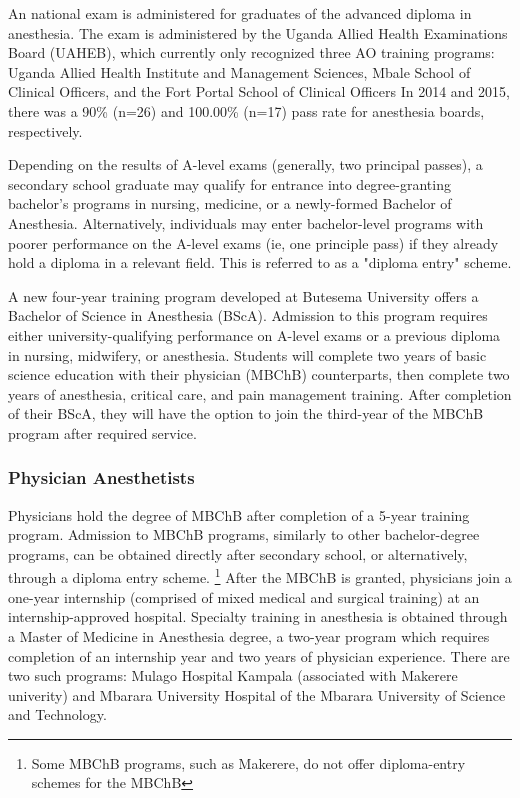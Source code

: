 \documentclass[12pt]{article} %
\begin{document}
An national exam is administered for graduates of the advanced diploma in anesthesia. The exam is administered by the Uganda Allied Health Examinations Board (UAHEB), which currently only recognized three AO training programs: Uganda Allied Health Institute and Management Sciences, Mbale School of Clinical Officers, and the Fort Portal School of Clinical Officers
\citet{examboardschools}
In 2014 and 2015, there was a 90\%  (n=26) and 100.00\% (n=17) pass rate for anesthesia boards, respectively.
\citet{examboard2015}

Depending on the results of A-level exams (generally, two principal passes), a secondary school graduate may qualify for entrance into degree-granting bachelor's programs in nursing, medicine, or a newly-formed Bachelor of Anesthesia. Alternatively, individuals may enter bachelor-level programs with poorer performance on the A-level exams (ie, one principle pass) if they already hold a diploma in a relevant field. This is referred to as a "diploma entry" scheme.
\citet{mak2018}

A new four-year training program developed at Butesema University offers a Bachelor of Science in Anesthesia (BScA). Admission to this program requires either university-qualifying performance on A-level exams or a previous diploma in nursing, midwifery, or anesthesia. Students will complete two years of basic science education with their physician (MBChB) counterparts, then complete two years of anesthesia, critical care, and pain management training. After completion of their BScA, they will have the option to join the third-year of the MBChB program after required service.
\citet{aau2018}

\subsubsection{Physician Anesthetists}

Physicians hold the degree of MBChB after completion of a 5-year training program. Admission to MBChB programs, similarly to other bachelor-degree programs, can be obtained directly after secondary school, or alternatively, through a diploma entry scheme. \footnote{Some MBChB programs, such as Makerere, do not offer diploma-entry schemes for the MBChB} After the MBChB is granted, physicians join a one-year internship (comprised of mixed medical and surgical training) at an internship-approved hospital.
\citet{must2014}
Specialty training in anesthesia is obtained through a Master of Medicine in Anesthesia degree, a two-year program which requires completion of an internship year and two years of physician experience. There are two such programs: Mulago Hospital Kampala (associated with Makerere univerity) and Mbarara University Hospital of the Mbarara University of Science and Technology.
\end{document}
